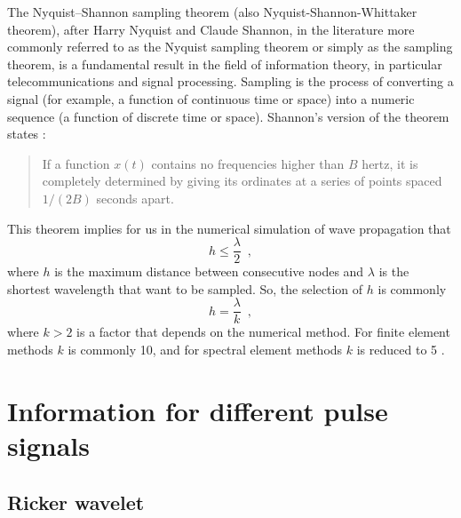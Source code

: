 \documentclass[12pt,letterpaper,landscape]{article}
\begin{document}
The Nyquist–Shannon sampling theorem (also Nyquist-Shannon-Whittaker theorem), after Harry Nyquist and Claude Shannon, in the literature more commonly referred to as the Nyquist sampling theorem or simply as the sampling theorem, is a fundamental result in the field of information theory, in particular telecommunications and signal processing. Sampling is the process of converting a signal (for example, a function of continuous time or space) into a numeric
sequence (a function of discrete time or space). Shannon's version of the theorem states \cite{Shannon}:
\begin{quote}
If a function $x(t)$ contains no frequencies higher than $B$ hertz,
it is completely determined by giving its ordinates at a series of
points spaced $1/(2B)$ seconds apart. 
\end{quote}
This theorem implies for us in the numerical simulation of wave propagation
that 
\[
h\leq\frac{\lambda}{2}\enspace,
\]
 where $h$ is the maximum distance between consecutive nodes and
$\lambda$ is the shortest wavelength that want to be sampled. So,
the selection of $h$ is commonly 
\[
h=\frac{\lambda}{k}\enspace,
\]
 where $k>2$ is a factor that depends on the numerical method. For
finite element methods $k$ is commonly 10, and for spectral element
methods $k$ is reduced to 5 \cite{Komatitsch99}.


\section{Information for different pulse signals}

\subsection{Ricker wavelet}
\end{document}
